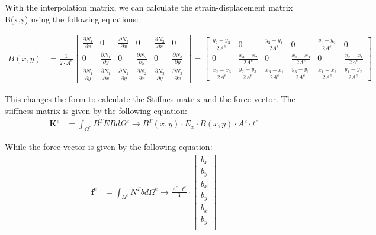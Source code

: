\documentclass{article}  %
\begin{document}
With the interpolation matrix, we can calculate the strain-displacement matrix B(x,y) using the following equations:

\begin{align}
  B(x,y) &= \frac{1}{2 \cdot A^e} \begin{bmatrix}
    \frac{\partial N_1}{\partial x} & 0 & \frac{\partial N_2}{\partial x} & 0 & \frac{\partial N_3}{\partial x} & 0 \\
    0 & \frac{\partial N_1}{\partial y} & 0 & \frac{\partial N_2}{\partial y} & 0 & \frac{\partial N_3}{\partial y} \\
    \frac{\partial N_1}{\partial y} & \frac{\partial N_1}{\partial x} & \frac{\partial N_2}{\partial y} & \frac{\partial N_2}{\partial x} & \frac{\partial N_3}{\partial y} & \frac{\partial N_3}{\partial x}
  \end{bmatrix} 
  = \begin{bmatrix}
    \frac{y_2-y_3}{2A^e} & 0 & \frac{y_3-y_1}{2A^e} & 0 & \frac{y_1-y_2}{2A^e} & 0 \\
    0 & \frac{x_3-x_2}{2A^e} & 0 & \frac{x_1-x_3}{2A^e} & 0 & \frac{x_2-x_1}{2A^e} \\
    \frac{x_2-x_3}{2A^e} & \frac{y_2-y_3}{2A^e} & \frac{x_3-x_1}{2A^e} & \frac{y_3-y_1}{2A^e} & \frac{x_1-x_2}{2A^e} & \frac{y_1-y_2}{2A^e}
  \end{bmatrix}
\end{align}


This changes the form to calculate the Stiffnes matrix and the force vector. The stiffness matrix is given by the following equation:
\begin{align}
  \mathbf{K}^e &= \int_{\Omega^e} B^T E B d\Omega^e \rightarrow B^T(x,y) \cdot E_x \cdot B(x,y) \cdot  A^e \cdot t^e
\end{align}

While the force vector is given by the following equation:
\begin{align}
  \mathbf{f}^e &= \int_{\Omega^e} N^T b d\Omega^e \rightarrow \frac{A^e \cdot t^e}{3} \cdot \begin{bmatrix}
    b_x \\
    b_y \\
    b_x \\
    b_y \\
    b_x \\
    b_y \\
  \end{bmatrix} 
\end{align}
\end{document}
